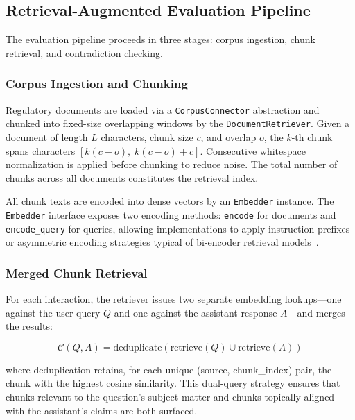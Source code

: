 \documentclass[11pt]{article}
\begin{document}
\subsection{Retrieval-Augmented Evaluation Pipeline}

The evaluation pipeline proceeds in three stages: corpus ingestion, chunk retrieval, and contradiction checking.

\subsubsection{Corpus Ingestion and Chunking}

Regulatory documents are loaded via a \texttt{CorpusConnector} abstraction and chunked into fixed-size overlapping windows by the \texttt{DocumentRetriever}. Given a document of length $L$ characters, chunk size $c$, and overlap $o$, the $k$-th chunk spans characters $[k(c - o),\; k(c - o) + c]$. Consecutive whitespace normalization is applied before chunking to reduce noise. The total number of chunks across all documents constitutes the retrieval index.

All chunk texts are encoded into dense vectors by an \texttt{Embedder} instance. The \texttt{Embedder} interface exposes two encoding methods: \texttt{encode} for documents and \texttt{encode\_query} for queries, allowing implementations to apply instruction prefixes or asymmetric encoding strategies typical of bi-encoder retrieval models~\cite{reimers2019sentencebert}.

\subsubsection{Merged Chunk Retrieval}

For each interaction, the retriever issues two separate embedding lookups---one against the user query $Q$ and one against the assistant response $A$---and merges the results:

\begin{equation}
    \mathcal{C}(Q, A) = \text{deduplicate}\!\left(\text{retrieve}(Q) \cup \text{retrieve}(A)\right)
\end{equation}

where deduplication retains, for each unique (source, chunk\_index) pair, the chunk with the highest cosine similarity. This dual-query strategy ensures that chunks relevant to the question's subject matter and chunks topically aligned with the assistant's claims are both surfaced.
\end{document}
